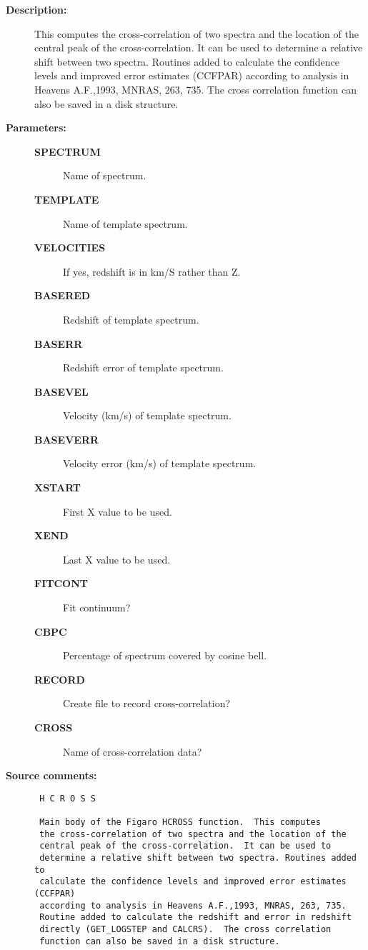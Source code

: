 \begin{description}

\item [{\bf Description:}]
 This computes the cross-correlation of two spectra and
 the location of the central peak of the cross-correlation.
 It can be used to determine a relative shift between two
 spectra. Routines added to calculate the confidence levels
 and improved error estimates (CCFPAR) according to analysis
 in Heavens A.F.,1993, MNRAS, 263, 735.  The cross correlation
 function can also be saved in a disk structure.


\item [{\bf Parameters:}]
\begin{description}
\item [{\bf SPECTRUM}]
 Name of spectrum.
\item [{\bf TEMPLATE}]
 Name of template spectrum.
\item [{\bf VELOCITIES}]
 If yes, redshift is in km/S rather than Z.
\item [{\bf BASERED}]
 Redshift of template spectrum.
\item [{\bf BASERR}]
 Redshift error of template spectrum.
\item [{\bf BASEVEL}]
 Velocity (km/s) of template spectrum.
\item [{\bf BASEVERR}]
 Velocity error (km/s) of template spectrum.
\item [{\bf XSTART}]
 First X value to be used.
\item [{\bf XEND}]
 Last X value to be used.
\item [{\bf FITCONT}]
 Fit continuum?
\item [{\bf CBPC}]
 Percentage of spectrum covered by cosine bell.
\item [{\bf RECORD}]
 Create file to record cross-correlation?
\item [{\bf CROSS}]
 Name of cross-correlation data?
\end{description}

\item [{\bf Source comments:}]
\begin{verbatim}
 H C R O S S

 Main body of the Figaro HCROSS function.  This computes
 the cross-correlation of two spectra and the location of the
 central peak of the cross-correlation.  It can be used to
 determine a relative shift between two spectra. Routines added to
 calculate the confidence levels and improved error estimates (CCFPAR)
 according to analysis in Heavens A.F.,1993, MNRAS, 263, 735.
 Routine added to calculate the redshift and error in redshift
 directly (GET_LOGSTEP and CALCRS).  The cross correlation
 function can also be saved in a disk structure.


\end{verbatim}
\end{description}
